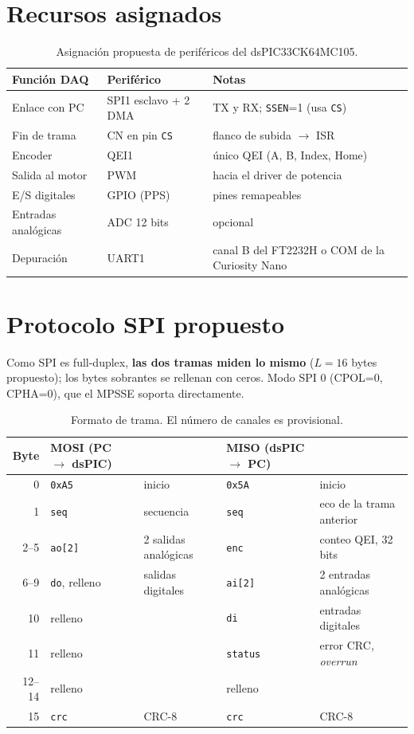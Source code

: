 \documentclass[11pt]{article}
\begin{document}
\section{Recursos asignados}

\begin{table}[H]
\centering
\begin{tabular}{@{}lll@{}}
\toprule
Función DAQ & Periférico & Notas \\ \midrule
Enlace con PC & SPI1 esclavo + 2 DMA & TX y RX; \texttt{SSEN}=1 (usa \texttt{CS}) \\
Fin de trama & CN en pin \texttt{CS} & flanco de subida $\to$ ISR \\
Encoder & QEI1 & único QEI (A, B, Index, Home) \\
Salida al motor & PWM & hacia el driver de potencia \\
E/S digitales & GPIO (PPS) & pines remapeables \\
Entradas analógicas & ADC 12 bits & opcional \\
Depuración & UART1 & canal B del FT2232H o COM de la Curiosity Nano \\
\bottomrule
\end{tabular}
\caption{Asignación propuesta de periféricos del dsPIC33CK64MC105.}
\end{table}

\section{Protocolo SPI propuesto}

Como SPI es full-duplex, \textbf{las dos tramas miden lo mismo} ($L = 16$ bytes
propuesto); los bytes sobrantes se rellenan con ceros. Modo SPI 0 (CPOL=0,
CPHA=0), que el MPSSE soporta directamente.

\begin{table}[H]
\centering
\begin{tabular}{@{}rll|ll@{}}
\toprule
Byte & MOSI (PC $\to$ dsPIC) & & MISO (dsPIC $\to$ PC) & \\ \midrule
0     & \texttt{0xA5} & inicio            & \texttt{0x5A} & inicio \\
1     & \texttt{seq}  & secuencia         & \texttt{seq}  & eco de la trama anterior \\
2--5  & \texttt{ao[2]} & 2 salidas analógicas & \texttt{enc} & conteo QEI, 32 bits \\
6--9  & \texttt{do}, relleno & salidas digitales & \texttt{ai[2]} & 2 entradas analógicas \\
10    & relleno & & \texttt{di} & entradas digitales \\
11    & relleno & & \texttt{status} & error CRC, \emph{overrun} \\
12--14 & relleno & & relleno & \\
15    & \texttt{crc} & CRC-8 & \texttt{crc} & CRC-8 \\ \bottomrule
\end{tabular}
\caption{Formato de trama. El número de canales es provisional.}
\end{table}
\end{document}
